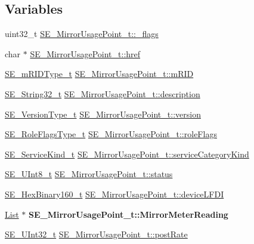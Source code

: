\subsection*{Variables}
\begin{DoxyCompactItemize}
\item 
uint32\+\_\+t \hyperlink{group__MirrorUsagePoint_gae7ccaba110d336f5865327821a929458}{S\+E\+\_\+\+Mirror\+Usage\+Point\+\_\+t\+::\+\_\+flags}
\item 
char $\ast$ \hyperlink{group__MirrorUsagePoint_ga7e3949f465787de6dcb910e837c1e277}{S\+E\+\_\+\+Mirror\+Usage\+Point\+\_\+t\+::href}
\item 
\hyperlink{group__mRIDType_gac74622112f3a388a2851b2289963ba5e}{S\+E\+\_\+m\+R\+I\+D\+Type\+\_\+t} \hyperlink{group__MirrorUsagePoint_gacc4f91c3038a5cb63ddf1e7c6ee9f88c}{S\+E\+\_\+\+Mirror\+Usage\+Point\+\_\+t\+::m\+R\+ID}
\item 
\hyperlink{group__String32_gac9f59b06b168b4d2e0d45ed41699af42}{S\+E\+\_\+\+String32\+\_\+t} \hyperlink{group__MirrorUsagePoint_ga28da144f8ced80b96a6de4426ceded85}{S\+E\+\_\+\+Mirror\+Usage\+Point\+\_\+t\+::description}
\item 
\hyperlink{group__VersionType_ga4b8d27838226948397ed99f67d46e2ae}{S\+E\+\_\+\+Version\+Type\+\_\+t} \hyperlink{group__MirrorUsagePoint_ga5b263a4254e4f7b510a2dd5fe22e598c}{S\+E\+\_\+\+Mirror\+Usage\+Point\+\_\+t\+::version}
\item 
\hyperlink{group__RoleFlagsType_gac20b70bba5dd7d6773b13d69c372c957}{S\+E\+\_\+\+Role\+Flags\+Type\+\_\+t} \hyperlink{group__MirrorUsagePoint_ga467c197b2446145027bcbe19c9a9ffea}{S\+E\+\_\+\+Mirror\+Usage\+Point\+\_\+t\+::role\+Flags}
\item 
\hyperlink{group__ServiceKind_ga19a788255c7eeda579474fc6f3cc0810}{S\+E\+\_\+\+Service\+Kind\+\_\+t} \hyperlink{group__MirrorUsagePoint_gaf3b5785d54afaf564eab607a2b902671}{S\+E\+\_\+\+Mirror\+Usage\+Point\+\_\+t\+::service\+Category\+Kind}
\item 
\hyperlink{group__UInt8_gaf7c365a1acfe204e3a67c16ed44572f5}{S\+E\+\_\+\+U\+Int8\+\_\+t} \hyperlink{group__MirrorUsagePoint_ga4c5a5200060df3be9b92c9d496b0b526}{S\+E\+\_\+\+Mirror\+Usage\+Point\+\_\+t\+::status}
\item 
\hyperlink{group__HexBinary160_ga92b92aa55555bdb75f3a59060f2c1632}{S\+E\+\_\+\+Hex\+Binary160\+\_\+t} \hyperlink{group__MirrorUsagePoint_gac9a4ce8c876e783cfdf0bf905b7ec5fc}{S\+E\+\_\+\+Mirror\+Usage\+Point\+\_\+t\+::device\+L\+F\+DI}
\item 
\mbox{\label{group__MirrorUsagePoint_gadf0acf37cc4d45c01ddd5aa7fcde9c78}} 
\hyperlink{structList}{List} $\ast$ {\bfseries S\+E\+\_\+\+Mirror\+Usage\+Point\+\_\+t\+::\+Mirror\+Meter\+Reading}
\item 
\hyperlink{group__UInt32_ga70bd4ecda3c0c85d20779d685a270cdb}{S\+E\+\_\+\+U\+Int32\+\_\+t} \hyperlink{group__MirrorUsagePoint_gaddaeaee61ed734dc07e57b9b0614d6f5}{S\+E\+\_\+\+Mirror\+Usage\+Point\+\_\+t\+::post\+Rate}
\end{DoxyCompactItemize}



